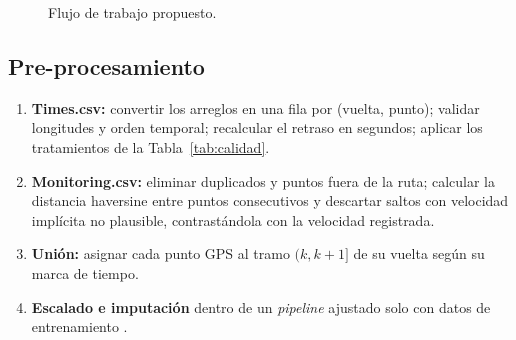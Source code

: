 \documentclass[conference,spanish]{IEEEtran}
\begin{document}
\begin{figure}[t]
\centering
{}
\caption{Flujo de trabajo propuesto.}
\label{fig:pipeline}
\end{figure}

\subsection{Pre-procesamiento}
\begin{enumerate}
    \item \textbf{Times.csv:} convertir los arreglos en una fila por (vuelta, punto); validar longitudes y orden temporal; recalcular el retraso en segundos; aplicar los tratamientos de la Tabla~\ref{tab:calidad}.
    \item \textbf{Monitoring.csv:} eliminar duplicados y puntos fuera de la ruta; calcular la distancia haversine entre puntos consecutivos y descartar saltos con velocidad implícita no plausible, contrastándola con la velocidad registrada.
    \item \textbf{Unión:} asignar cada punto GPS al tramo $(k,k{+}1]$ de su vuelta según su marca de tiempo.
    \item \textbf{Escalado e imputación} dentro de un \textit{pipeline} ajustado solo con datos de entrenamiento \cite{pedregosa2011}.
\end{enumerate}
\end{document}
